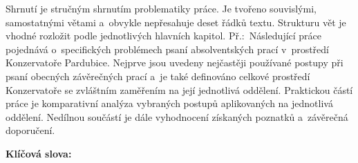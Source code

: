 Shrnutí je stručným shrnutím problematiky práce. Je tvořeno souvislými,
samostatnými větami a~obvykle nepřesahuje deset řádků textu. Strukturu vět je
vhodné rozložit podle jednotlivých hlavních kapitol. Př.:~Následující práce
pojednává o~specifických problémech psaní absolventských prací v~prostředí
Konzervatoře Pardubice. Nejprve jsou uvedeny nejčastěji používané postupy při
psaní obecných závěrečných prací a~je také definováno celkové prostředí
Konzervatoře se zvláštním zaměřením na její jednotlivá oddělení. Praktickou
částí práce je komparativní analýza vybraných postupů aplikovaných na jednotlivá
oddělení. Nedílnou součástí je dále vyhodnocení získaných poznatků a~závěrečná
doporučení.

\noindent
\textbf{Klíčová slova: } \klicovaslova
